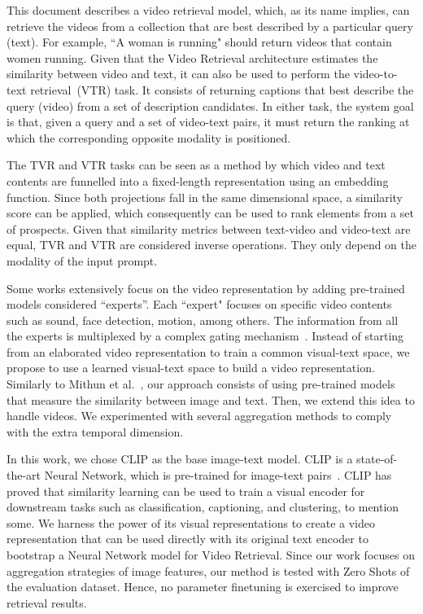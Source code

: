 \documentclass[a4paper,runningheads]{llncs}
\begin{document}
This document describes a video retrieval model, which, as its name implies, can retrieve the videos from a collection that are best described by a particular query (text). For example, ``A woman is running" should return videos that contain women running. Given that the Video Retrieval architecture estimates the similarity between video and text, it can also be used to perform the video-to-text retrieval~(VTR) task. It consists of returning captions that best describe the query (video) from a set of description candidates. In either task, the system goal is that, given a query and a set of video-text pairs, it must return the ranking at which the corresponding opposite modality is positioned.

The TVR and VTR tasks can be seen as a method by which video and text contents are funnelled into a fixed-length representation using an embedding function. Since both projections fall in the same dimensional space, a similarity score can be applied, which consequently can be used to rank elements from a set of prospects. Given that similarity metrics between text-video and video-text are equal, TVR and VTR are considered inverse operations. They only depend on the modality of the input prompt.

Some works extensively focus on the video representation by adding pre-trained models considered ``experts''.  Each ``expert" focuses on specific video contents such as sound, face detection, motion, among others. The information from all the experts is multiplexed by a complex gating mechanism~\cite{Gabeur2020MMT,Liu2020CE}. Instead of starting from an elaborated video representation to train a common visual-text space, we propose to use a learned visual-text space to build a video representation. Similarly to Mithun et al.~\cite{Mithun2018MultimodalCuesVSE}, our approach consists of using pre-trained models that measure the similarity between image and text. Then, we extend this idea to handle videos. We experimented with several aggregation methods to comply with the extra temporal dimension.

In this work, we chose CLIP as the base image-text model. CLIP is a state-of-the-art Neural Network, which is pre-trained for image-text pairs~\cite{Radford2021CLIP}. CLIP has proved that similarity learning can be used to train a visual encoder for downstream tasks such as classification, captioning, and clustering, to mention some. We harness the power of its visual representations to create a video representation that can be used directly with its original text encoder to bootstrap a Neural Network model for Video Retrieval. Since our work focuses on aggregation strategies of image features, our method is tested with Zero Shots of the evaluation dataset. Hence, no parameter finetuning is exercised to improve retrieval results.
\end{document}
